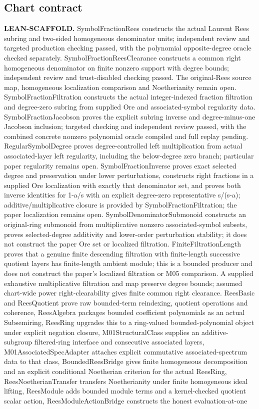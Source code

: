 \subsection{Chart contract}\hypertarget{claim:local-scaffold}{}\backmap
\textbf{LEAN-SCAFFOLD.} SymbolFractionRees constructs the actual Laurent Rees subring and two-sided homogeneous denominator units; independent review and targeted production checking passed, with the polynomial opposite-degree oracle checked separately. SymbolFractionReesClearance constructs a common right homogeneous denominator on finite nonzero support with degree bounds; independent review and trust-disabled checking passed. The original-Rees source map, homogeneous localization comparison and Noetherianity remain open. SymbolFractionFiltration constructs the actual integer-indexed fraction filtration and degree-zero subring from supplied Ore and associated-symbol regularity data. SymbolFractionJacobson proves the explicit subring inverse and degree-minus-one Jacobson inclusion; targeted checking and independent review passed, with the combined concrete nonzero polynomial oracle compiled and full replay pending. RegularSymbolDegree proves degree-controlled left multiplication from actual associated-layer left regularity, including the below-degree zero branch; particular paper regularity remains open. SymbolFractionInverse proves exact selected degree and preservation under lower perturbations, constructs right fractions in a supplied Ore localization with exactly that denominator set, and proves both inverse identities for 1-a/s with an explicit degree-zero representative s/(s-a); additive/multiplicative closure is provided by SymbolFractionFiltration; the paper localization remains open. SymbolDenominatorSubmonoid constructs an original-ring submonoid from multiplicative nonzero associated-symbol subsets, proves selected-degree additivity and lower-order perturbation stability; it does not construct the paper Ore set or localized filtration. FiniteFiltrationLength proves that a genuine finite descending filtration with finite-length successive quotient layers has finite-length ambient module; this is a bounded producer and does not construct the paper's localized filtration or M05 comparison. A supplied exhaustive multiplicative filtration and map preserve degree bounds; assumed chart-wide power right-clearability gives finite common right clearance. ReesBasic and ReesQuotient prove raw bounded-term reindexing, quotient operations and coherence, ReesAlgebra packages bounded coefficient polynomials as an actual Subsemiring, ReesRing upgrades this to a ring-valued bounded-polynomial object under explicit negation closure, M01StructuralClass supplies an additive-subgroup filtered-ring interface and consecutive associated layers, M01AssociatedSpecAdapter attaches explicit commutative associated-spectrum data to that class, BoundedReesBridge gives finite homogeneous decomposition and an explicit conditional Noetherian criterion for the actual ReesRing, ReesNoetherianTransfer transfers Noetherianity under finite homogeneous ideal lifting, ReesModule adds bounded module terms and a kernel-checked quotient scalar action, ReesModuleActionBridge constructs the honest evaluation-at-one 